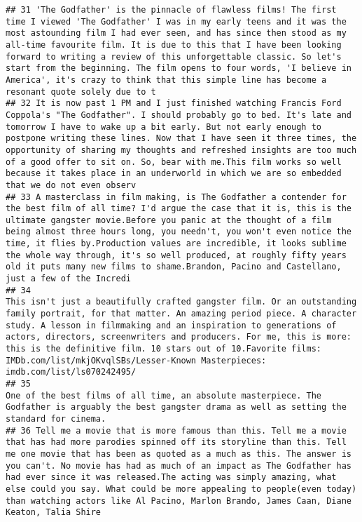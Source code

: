 \documentclass[
]{article}
\begin{document}
\begin{verbatim}
## 31 'The Godfather' is the pinnacle of flawless films! The first time I viewed 'The Godfather' I was in my early teens and it was the most astounding film I had ever seen, and has since then stood as my all-time favourite film. It is due to this that I have been looking forward to writing a review of this unforgettable classic. So let's start from the beginning. The film opens to four words, 'I believe in America', it's crazy to think that this simple line has become a resonant quote solely due to t
## 32 It is now past 1 PM and I just finished watching Francis Ford Coppola's "The Godfather". I should probably go to bed. It's late and tomorrow I have to wake up a bit early. But not early enough to postpone writing these lines. Now that I have seen it three times, the opportunity of sharing my thoughts and refreshed insights are too much of a good offer to sit on. So, bear with me.This film works so well because it takes place in an underworld in which we are so embedded that we do not even observ
## 33 A masterclass in film making, is The Godfather a contender for the best film of all time? I'd argue the case that it is, this is the ultimate gangster movie.Before you panic at the thought of a film being almost three hours long, you needn't, you won't even notice the time, it flies by.Production values are incredible, it looks sublime the whole way through, it's so well produced, at roughly fifty years old it puts many new films to shame.Brandon, Pacino and Castellano, just a few of the Incredi
## 34                                                                               This isn't just a beautifully crafted gangster film. Or an outstanding family portrait, for that matter. An amazing period piece. A character study. A lesson in filmmaking and an inspiration to generations of actors, directors, screenwriters and producers. For me, this is more: this is the definitive film. 10 stars out of 10.Favorite films: IMDb.com/list/mkjOKvqlSBs/Lesser-Known Masterpieces: imdb.com/list/ls070242495/
## 35                                                                                                                                                                                                                                                                                                                                                            One of the best films of all time, an absolute masterpiece. The Godfather is arguably the best gangster drama as well as setting the standard for cinema.
## 36 Tell me a movie that is more famous than this. Tell me a movie that has had more parodies spinned off its storyline than this. Tell me one movie that has been as quoted as a much as this. The answer is you can't. No movie has had as much of an impact as The Godfather has had ever since it was released.The acting was simply amazing, what else could you say. What could be more appealing to people(even today) than watching actors like Al Pacino, Marlon Brando, James Caan, Diane Keaton, Talia Shire 

\end{verbatim}
\end{document}

